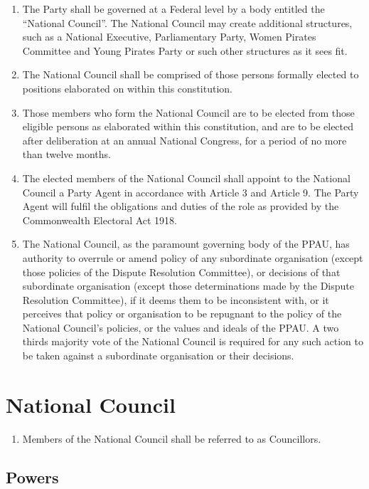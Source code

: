 \documentclass[a4paper,titlepage,8.5pt]{article}
\begin{document}
\begin{enumerate}
\item The Party shall be governed at a Federal level by a body entitled the ``National Council''. The National Council may create additional structures, such as a National Executive, Parliamentary Party, Women Pirates Committee and Young Pirates Party or such other structures as it sees fit.
\item The National Council shall be comprised of those persons formally elected to positions elaborated on within this constitution.
\item Those members who form the National Council are to be elected from those eligible persons as elaborated within this constitution, and are to be elected after deliberation at an annual National Congress, for a period of no more than twelve months.
\item The elected members of the National Council shall appoint to the National Council a Party Agent in accordance with Article 3 and Article 9. The Party Agent will fulfil the obligations and duties of the role as provided by the Commonwealth Electoral Act 1918.
\item The National Council, as the paramount governing body of the PPAU, has authority to overrule or amend policy of any subordinate organisation (except those policies of the Dispute Resolution Committee), or decisions of that subordinate organisation (except those determinations made by the Dispute Resolution Committee), if it deems them to be inconsistent with, or it perceives that policy or organisation to be repugnant to the policy of the National Council’s policies, or the values and ideals of the PPAU. A two thirds majority vote of the National Council is required for any such action to be taken against a subordinate organisation or their decisions.
\end{enumerate}

\section{National Council}

\begin{enumerate}
\item Members of the National Council shall be referred to as Councillors.
\end{enumerate}

\subsection{Powers}
\end{document}
